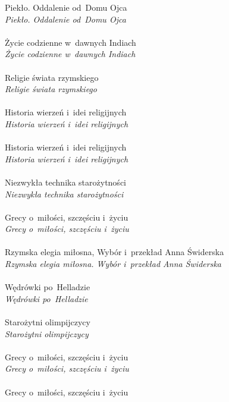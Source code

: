 \documentclass[a4paper,11pt]{article}
\begin{document}
\Jest  Piekło. Oddalenie od~Domu Ojca \\
\Powin \emph{Piekło. Oddalenie od~Domu Ojca} \\
 \\
\Jest  Życie codzienne w~dawnych Indiach \\
\Powin \emph{Życie codzienne w~dawnych Indiach} \\
 \\
\Jest  Religie świata rzymskiego \\
\Powin \emph{Religie świata rzymskiego} \\
 \\
\Jest  Historia wierzeń i~idei religijnych \\
\Powin \emph{Historia wierzeń i~idei religijnych} \\
 \\
\Jest  Historia wierzeń i~idei religijnych \\
\Powin \emph{Historia wierzeń i~idei religijnych} \\
 \\
\Jest  Niezwykła technika starożytności \\
\Powin \emph{Niezwykła technika starożytności} \\
 \\
\Jest  Grecy o~miłości, szczęściu i~życiu \\
\Powin \emph{Grecy o~miłości, szczęściu i~życiu} \\
 \\
\Jest  Rzymska elegia miłosna, Wybór i~przekład Anna Świderska \\
\Powin \emph{Rzymska elegia miłosna. Wybór i~przekład Anna Świderska} \\
 \\
\Jest  Wędrówki po~Helladzie \\
\Powin \emph{Wędrówki po~Helladzie} \\
 \\
\Jest  Starożytni olimpijczycy \\
\Powin \emph{Starożytni olimpijczycy} \\
 \\
\Jest  Grecy o~miłości, szczęściu i~życiu \\
\Powin \emph{Grecy o~miłości, szczęściu i~życiu} \\
 \\
\Jest  Grecy o~miłości, szczęściu i~życiu \\
\end{document}
